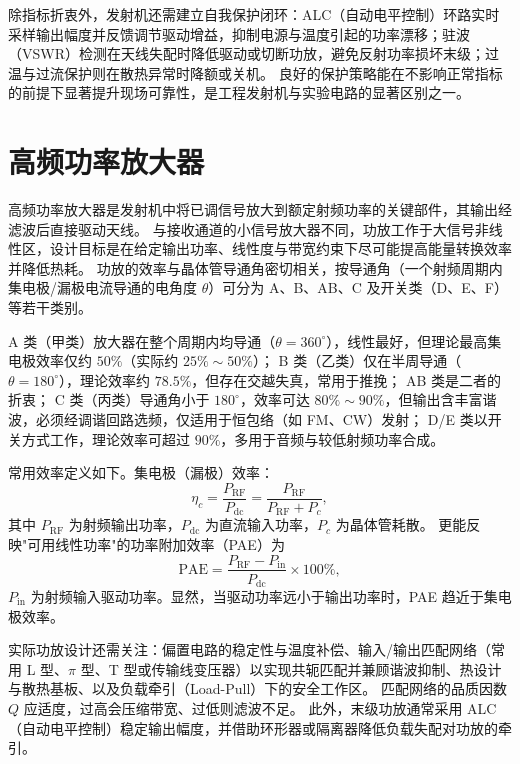 除指标折衷外，发射机还需建立自我保护闭环：ALC（自动电平控制）环路实时采样输出幅度并反馈调节驱动增益，抑制电源与温度引起的功率漂移；驻波（VSWR）检测在天线失配时降低驱动或切断功放，避免反射功率损坏末级；过温与过流保护则在散热异常时降额或关机。
良好的保护策略能在不影响正常指标的前提下显著提升现场可靠性，是工程发射机与实验电路的显著区别之一。

\section{高频功率放大器}
\label{sec:rf_power_amplifier}

高频功率放大器是发射机中将已调信号放大到额定射频功率的关键部件，其输出经滤波后直接驱动天线。
与接收通道的小信号放大器不同，功放工作于大信号非线性区，设计目标是在给定输出功率、线性度与带宽约束下尽可能提高能量转换效率并降低热耗。
功放的效率与晶体管导通角密切相关，按导通角（一个射频周期内集电极/漏极电流导通的电角度 $\theta$）可分为 A、B、AB、C 及开关类（D、E、F）等若干类别。

A 类（甲类）放大器在整个周期内均导通（$\theta = 360^\circ$），线性最好，但理论最高集电极效率仅约 $50\%$（实际约 $25\%\sim 50\%$）；
B 类（乙类）仅在半周导通（$\theta = 180^\circ$），理论效率约 $78.5\%$，但存在交越失真，常用于推挽；
AB 类是二者的折衷；
C 类（丙类）导通角小于 $180^\circ$，效率可达 $80\%\sim 90\%$，但输出含丰富谐波，必须经调谐回路选频，仅适用于恒包络（如 FM、CW）发射；
D/E 类以开关方式工作，理论效率可超过 $90\%$，多用于音频与较低射频功率合成。

常用效率定义如下。集电极（漏极）效率：
\begin{equation}
\eta_c = \frac{P_{\mathrm{RF}}}{P_{\mathrm{dc}}} = \frac{P_{\mathrm{RF}}}{P_{\mathrm{RF}}+P_c},
\end{equation}
其中 $P_{\mathrm{RF}}$ 为射频输出功率，$P_{\mathrm{dc}}$ 为直流输入功率，$P_c$ 为晶体管耗散。
更能反映"可用线性功率"的功率附加效率（PAE）为
\begin{equation}
\mathrm{PAE} = \frac{P_{\mathrm{RF}}-P_{\mathrm{in}}}{P_{\mathrm{dc}}}\times 100\%,
\end{equation}
$P_{\mathrm{in}}$ 为射频输入驱动功率。显然，当驱动功率远小于输出功率时，PAE 趋近于集电极效率。

实际功放设计还需关注：偏置电路的稳定性与温度补偿、输入/输出匹配网络（常用 L 型、$\pi$ 型、T 型或传输线变压器）以实现共轭匹配并兼顾谐波抑制、热设计与散热基板、以及负载牵引（Load-Pull）下的安全工作区。
匹配网络的品质因数 $Q$ 应适度，过高会压缩带宽、过低则滤波不足。
此外，末级功放通常采用 ALC（自动电平控制）稳定输出幅度，并借助环形器或隔离器降低负载失配对功放的牵引。

